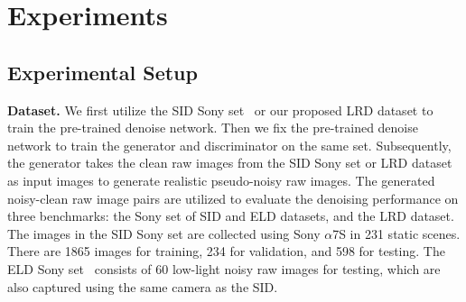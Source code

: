 \documentclass[10pt,twocolumn,letterpaper]{article}
\begin{document}
\begin{table}[!t]
\centering
\caption{Average Kullback-Leibler divergence (AKLD)~\cite{yue2020dual} evaluation of different noise models. Our proposed noise model outperforms state-of-the-art methods on both SID and LRD datasets.}
\vspace{2pt}
\label{table:KLD}
\vspace{-3ex}
\end{table}

\vspace{-0.5em}
\section{Experiments}
\label{experiment}
\vspace{-0.5em}
\subsection{Experimental Setup}
\vspace{-0.5em}
\textbf{Dataset.} We first utilize the SID Sony set~\cite{chen2018learning} or our proposed LRD dataset to train the pre-trained denoise network. Then we fix the pre-trained denoise network to train the generator and discriminator on the same set. Subsequently, the generator takes the clean raw images from the SID Sony set or LRD dataset as input images to generate realistic pseudo-noisy raw images. The generated noisy-clean raw image pairs are utilized to evaluate the denoising performance on three benchmarks: the Sony set of SID and ELD datasets, and the LRD dataset. The images in the SID Sony set are collected using Sony $\alpha$7S\uppercase\expandafter{} in 231 static scenes. There are 1865 images for training, 234 for validation, and 598 for testing. The ELD Sony set~\cite{wei2020physics} consists of 60 low-light noisy raw images for testing, which are also captured using the same camera as the SID.
\end{document}
